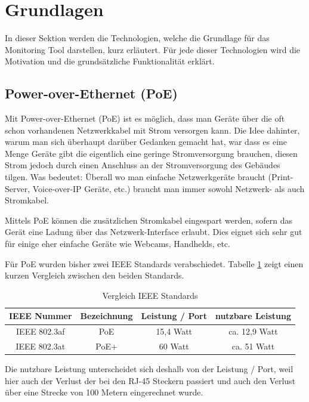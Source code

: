 \section{Grundlagen}
\label{sec:basics}

In dieser Sektion werden die Technologien, welche die Grundlage für das Monitoring Tool darstellen, kurz erläutert. Für jede dieser Technologien wird die Motivation und die grundsätzliche Funktionalität erklärt.

\subsection{Power-over-Ethernet (PoE)}
\label{sec:poe}
Mit Power-over-Ethernet (PoE) ist es möglich, dass man Geräte über die oft schon vorhandenen Netzwerkkabel mit Strom versorgen kann. Die Idee dahinter, warum man sich überhaupt darüber Gedanken gemacht hat, war dass es eine Menge Geräte gibt die eigentlich eine geringe Stromversorgung brauchen, diesen Strom jedoch durch einen Anschluss an der Stromversorgung des Gebäudes tilgen. Was bedeutet: Überall wo man einfache Netzwerkgeräte braucht (Print-Server, Voice-over-IP Geräte, etc.) braucht man immer sowohl Netzwerk- als auch Stromkabel.

Mittels PoE können die zusätzlichen Stromkabel eingespart werden, sofern das Gerät eine Ladung über das Netzwerk-Interface erlaubt. Dies eignet sich sehr gut für einige eher einfache Geräte wie Webcams, Handhelds, etc.

Für PoE wurden bisher zwei IEEE Standards verabschiedet. Tabelle \ref{tab:compareIeee} zeigt einen kurzen Vergleich zwischen den beiden Standards.

\begin{table}[h]
 \centering
 \begin{tabular}{|c|c|c|c|}
   \hline
   \textbf{IEEE Nummer} & \textbf{Bezeichnung} & \textbf{Leistung / Port} & \textbf{nutzbare Leistung} \\
   \hline
   IEEE 802.3af & PoE & 15,4 Watt & ca. 12,9 Watt \\
   \hline
   IEEE 802.3at & PoE+ & 60 Watt & ca. 51 Watt \\
   \hline
 \end{tabular}
 \caption{Vergleich IEEE Standards \cite{poe2}}
 \label{tab:compareIeee}
\end{table}

Die nutzbare Leistung unterscheidet sich deshalb von der Leistung / Port, weil hier auch der Verlust der bei den RJ-45 Steckern passiert und auch den Verlust über eine Strecke von 100 Metern eingerechnet wurde.

